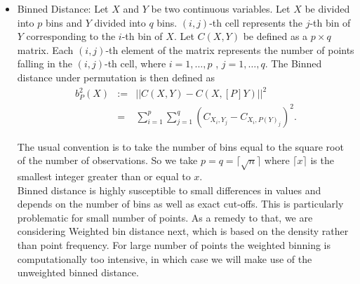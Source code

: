 \documentclass[12]{report}
\begin{document}
\begin{itemize}
\item Binned Distance:
Let $X$ and $Y$ be two continuous variables. Let $X$ be divided into $p$ bins and $Y$ divided into $q$ bins. $(i,j)$-th cell represents the $j$-th bin of $Y$ corresponding to the $i$-th bin of $X$. Let $C(X,Y)$ be defined as a $p \times q$ matrix. Each $(i,j)$-th element of the matrix represents the number of points falling in the $(i,j)$-th cell, where $i = 1, \dots, p$ , $j = 1, \dots, q$.
The Binned distance under permutation is then defined as
\begin{eqnarray*}
b^2_P(X) &:=& ||C(X,Y) - C(X,[P]Y)||^2 \\ &=& \sum_{i=1}^p \sum_{j=1}^q (C_{X_i,Y_j} - C_{X_i,P(Y)_j})^2.
\end{eqnarray*}

The usual convention is to take the number of bins equal to the square root of the number of observations. So we take $p = q = \lceil{\sqrt{n}} \rceil$ where $\lceil{x} \rceil$ is the smallest integer greater than or equal to $x$. \\

Binned distance is highly susceptible to small differences in values and depends on the number of bins as well as exact cut-offs. This is particularly problematic for small number of points. As a remedy to that, we are considering Weighted bin distance next, which is based on the density rather than point frequency. For large number of points the weighted binning is computationally too intensive, in which case we will make use of the unweighted  binned distance.



\end{itemize}
\end{document}
